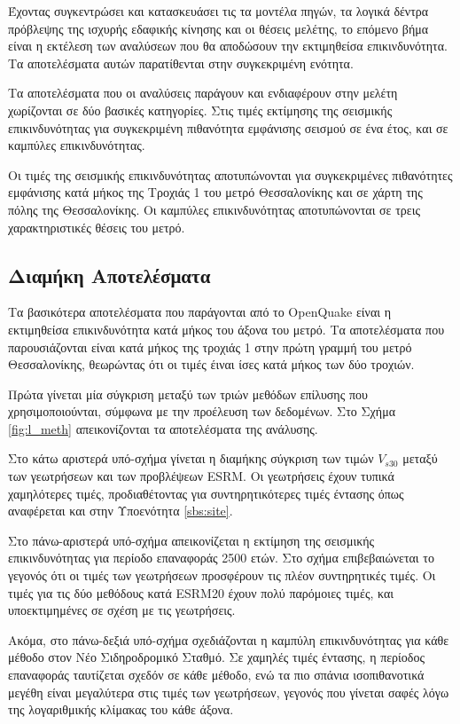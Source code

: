 Έχοντας συγκεντρώσει και κατασκευάσει τις τα μοντέλα πηγών, τα λογικά δέντρα πρόβλεψης της ισχυρής εδαφικής κίνησης και οι θέσεις μελέτης, το επόμενο βήμα είναι η εκτέλεση των αναλύσεων που θα αποδώσουν την εκτιμηθείσα επικινδυνότητα. Τα αποτελέσματα αυτών παρατίθενται στην συγκεκριμένη ενότητα.

Τα αποτελέσματα που οι αναλύσεις παράγουν και ενδιαφέρουν στην μελέτη χωρίζονται σε δύο βασικές κατηγορίες. Στις τιμές εκτίμησης της σεισμικής επικινδυνότητας για συγκεκριμένη πιθανότητα εμφάνισης σεισμού σε ένα έτος, και σε καμπύλες επικινδυνότητας.

Οι τιμές της σεισμικής επικινδυνότητας αποτυπώνονται για συγκεκριμένες πιθανότητες εμφάνισης κατά μήκος της Τροχιάς 1 του μετρό Θεσσαλονίκης και σε χάρτη της πόλης της Θεσσαλονίκης. Οι καμπύλες επικινδυνότητας αποτυπώνονται σε τρεις χαρακτηριστικές θέσεις του μετρό.

\subsection{Διαμήκη Αποτελέσματα}
Τα βασικότερα αποτελέσματα που παράγονται από το OpenQuake είναι η εκτιμηθείσα επικινδυνότητα κατά μήκος του άξονα του μετρό. Τα αποτελέσματα που παρουσιάζονται είναι κατά μήκος της τροχιάς 1 στην πρώτη γραμμή του μετρό Θεσσαλονίκης, θεωρώντας ότι οι τιμές έιναι ίσες κατά μήκος των δύο τροχιών.

Πρώτα γίνεται μία σύγκριση μεταξύ των τριών μεθόδων επίλυσης που χρησιμοποιούνται, σύμφωνα με την προέλευση των δεδομένων. Στο Σχήμα \ref{fig:l_meth} απεικονίζονται τα αποτελέσματα της ανάλυσης.

Στο κάτω αριστερά υπό-σχήμα γίνεται η διαμήκης σύγκριση των τιμών $V_{s30}$ μεταξύ των γεωτρήσεων και των προβλέψεων ESRM. Οι γεωτρήσεις έχουν τυπικά χαμηλότερες τιμές, προδιαθέτοντας για συντηρητικότερες τιμές έντασης όπως αναφέρεται και στην Υποενότητα \ref{sbs:site}.

Στο πάνω-αριστερά υπό-σχήμα απεικονίζεται η εκτίμηση της σεισμικής επικινδυνότητας για περίοδο επαναφοράς 2500 ετών. Στο σχήμα επιβεβαιώνεται το γεγονός ότι οι τιμές των γεωτρήσεων προσφέρουν τις πλέον συντηρητικές τιμές. Οι τιμές για τις δύο μεθόδους κατά ESRM20 έχουν πολύ παρόμοιες τιμές, και υποεκτιμημένες σε σχέση με τις γεωτρήσεις.
	
Ακόμα, στο πάνω-δεξιά υπό-σχήμα σχεδιάζονται η καμπύλη επικινδυνότητας για κάθε μέθοδο στον Νέο Σιδηροδρομικό Σταθμό. Σε χαμηλές τιμές έντασης, η περίοδος επαναφοράς ταυτίζεται σχεδόν σε κάθε μέθοδο, ενώ τα πιο σπάνια ισοπιθανοτικά μεγέθη είναι μεγαλύτερα στις τιμές των γεωτρήσεων, γεγονός που γίνεται σαφές λόγω της λογαριθμικής κλίμακας του κάθε άξονα.

